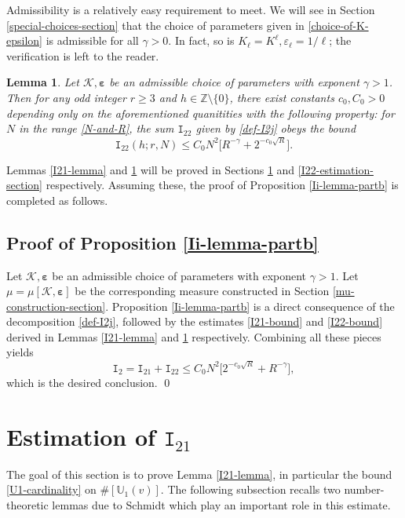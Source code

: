 \documentclass[12pt, twoside]{article}
\newtheorem{lemma}[theorem]{Lemma}
\theoremstyle{definition}
\numberwithin{equation}{section}
\begin{document}
Admissibility is a relatively easy requirement to meet. We will see in Section \ref{special-choices-section} that the choice of parameters given in \eqref{choice-of-K-epsilon} is admissible for all $\gamma > 0$. In fact, so is $K_{\ell} = K^{\ell}, \varepsilon_{\ell} = 1/\ell$; the verification is left to the reader. 
\begin{lemma} \label{I22-lemma}
Let $\mathcal K, \pmb{\varepsilon}$ be an admissible choice of parameters with exponent $\gamma > 1$. Then for any odd integer $r \geq 3$ and $h \in \mathbb Z \setminus \{0\}$, there exist constants $c_0, C_0 > 0$ depending only on the aforementioned quanitities  with the following property: for $N$ in the range \eqref{N-and-R}, the sum $\mathtt I_{22}$ given by \eqref{def-I2j} obeys the bound 
\begin{equation} \label{I22-bound}
\mathtt I_{22}(h; r, N) \leq C_0 N^2 \bigl[ R^{-\gamma} + 2^{-c_0 \sqrt{R}} \bigr]. 
\end{equation} 
\end{lemma} 
\noindent Lemmas \ref{I21-lemma} and \ref{I22-lemma} will be proved in Sections \ref{I21-estimation-section} and \ref{I22-estimation-section} respectively. Assuming these, the proof of Proposition \ref{Ii-lemma-partb} is completed as follows. 

\subsection{Proof of Proposition \ref{Ii-lemma-partb}}
Let $\mathcal K, \pmb{\varepsilon}$ be an admissible choice of parameters with exponent $\gamma > 1$. Let $\mu = \mu[\mathcal K, \pmb{\varepsilon}]$ be the corresponding measure constructed in Section \ref{mu-construction-section}. Proposition \ref{Ii-lemma-partb} is a direct consequence of the decomposition \eqref{def-I2j}, followed by the estimates \eqref{I21-bound} and \eqref{I22-bound} derived in Lemmas \ref{I21-lemma} and \ref{I22-lemma} respectively. Combining all these pieces yields
\[ \mathtt I_2 = \mathtt I_{21} + \mathtt I_{22} \leq C_0 N^2 \bigl[2^{-c_0 \sqrt{R}} + R^{-\gamma} \bigr], \]
which is the desired conclusion.  
\qed 
\section{Estimation of $\mathtt I_{21}$} \label{I21-estimation-section}
The goal of this section is to prove Lemma \ref{I21-lemma}, in particular the bound \eqref{U1-cardinality} on $\#[\mathbb U_1(v)]$. The following subsection recalls two number-theoretic lemmas due to Schmidt \cite{s60} which play an important role in this estimate.  
\end{document}
